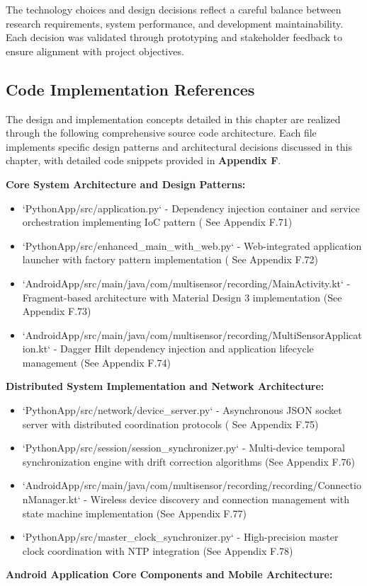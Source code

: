 \documentclass[12pt,a4paper]{report}
\begin{document}
The technology choices and design decisions reflect a careful balance between research requirements, system performance,
and development maintainability. Each decision was validated through prototyping and stakeholder feedback to ensure
alignment with project objectives.

\subsection{Code Implementation References}

The design and implementation concepts detailed in this chapter are realized through the following comprehensive source
code architecture. Each file implements specific design patterns and architectural decisions discussed in this chapter,
with detailed code snippets provided in \textbf{Appendix F}.

\textbf{Core System Architecture and Design Patterns:}

\begin{itemize}
\item `PythonApp/src/application.py` - Dependency injection container and service orchestration implementing IoC pattern (
  See Appendix F.71)
\item `PythonApp/src/enhanced_main_with_web.py` - Web-integrated application launcher with factory pattern implementation (
  See Appendix F.72)
\item `AndroidApp/src/main/java/com/multisensor/recording/MainActivity.kt` - Fragment-based architecture with Material
  Design 3 implementation (See Appendix F.73)
\item `AndroidApp/src/main/java/com/multisensor/recording/MultiSensorApplication.kt` - Dagger Hilt dependency injection and
  application lifecycle management (See Appendix F.74)

\end{itemize}
\textbf{Distributed System Implementation and Network Architecture:}

\begin{itemize}
\item `PythonApp/src/network/device_server.py` - Asynchronous JSON socket server with distributed coordination protocols (
  See Appendix F.75)
\item `PythonApp/src/session/session_synchronizer.py` - Multi-device temporal synchronization engine with drift correction
  algorithms (See Appendix F.76)
\item `AndroidApp/src/main/java/com/multisensor/recording/recording/ConnectionManager.kt` - Wireless device discovery and
  connection management with state machine implementation (See Appendix F.77)
\item `PythonApp/src/master_clock_synchronizer.py` - High-precision master clock coordination with NTP integration (See
  Appendix F.78)

\end{itemize}
\textbf{Android Application Core Components and Mobile Architecture:}
\end{document}
